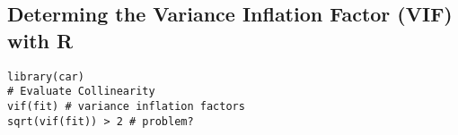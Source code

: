 \newpage
\subsection{Determing the Variance Inflation Factor (VIF) with R}
\begin{verbatim}
library(car)
# Evaluate Collinearity
vif(fit) # variance inflation factors
sqrt(vif(fit)) > 2 # problem?
\end{verbatim}
%
%


%
%
%
%
%



